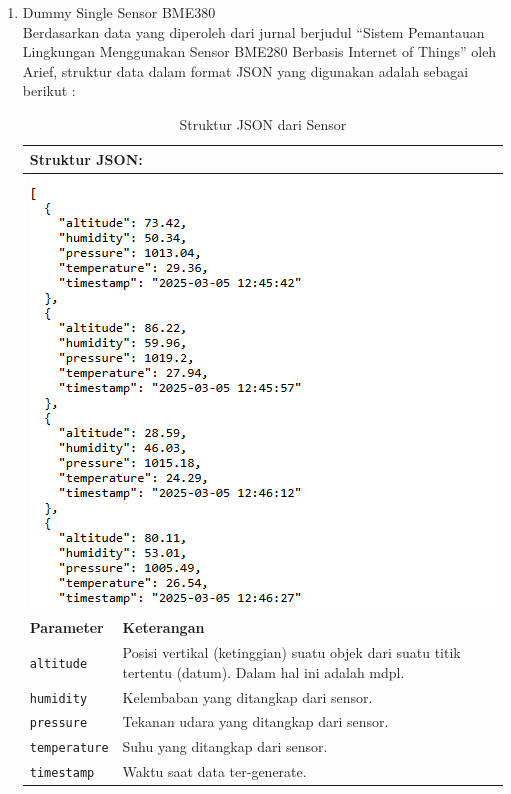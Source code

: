 \begin{enumerate}[label={\alph*.}]
	\item Dummy Single Sensor BME380 \\
	Berdasarkan data yang diperoleh dari jurnal berjudul “Sistem Pemantauan Lingkungan Menggunakan Sensor BME280 Berbasis Internet of Things” \cite{Triawan2023} oleh Arief, struktur data dalam format JSON yang digunakan adalah sebagai berikut : 
	\pagebreak
	
	\begin{longtable}{|p{.35\linewidth}|p{.60\linewidth}|}
		\caption{Struktur JSON dari Sensor}
		\label{tab:json_sensor} \\  
		\hline
		\multicolumn{2}{|l|}{\textbf{Struktur JSON:}} \\ \hline
		\multicolumn{2}{|c|}{%
			\includegraphics[width=0.8\linewidth, margin=5pt 10pt 5pt 10pt ]{gambar/Metodologi/StrukturJson.png}
		} \\ \hline
		\textbf{Parameter} & \textbf{Keterangan} \\ \hline
		\texttt{altitude} & Posisi vertikal (ketinggian) suatu objek dari suatu titik tertentu (datum). Dalam hal ini adalah mdpl. \\ \hline
		\texttt{humidity} & Kelembaban yang ditangkap dari sensor. \\ \hline
		\texttt{pressure} & Tekanan udara yang ditangkap dari sensor. \\ \hline
		\texttt{temperature} & Suhu yang ditangkap dari sensor. \\ \hline
		\texttt{timestamp} & Waktu saat data ter-generate. \\ \hline
	\end{longtable}
	

\end{enumerate}
